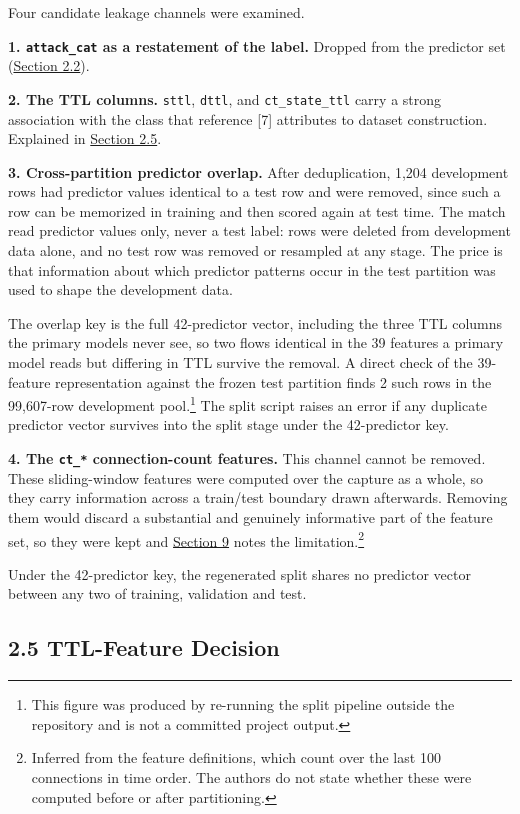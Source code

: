 \documentclass[
  canadian,
  12pt,
]{article}
\let\reportOrigSubsection\subsection
\renewcommand{\subsection}{\par\Needspace*{8\baselineskip}\reportOrigSubsection}%
\begin{document}
Four candidate leakage channels were examined.

\textbf{1. \texttt{attack\_cat} as a restatement of the label.} Dropped
from the predictor set (\hyperref[sec-2-2]{Section 2.2}).

\textbf{2. The TTL columns.} \texttt{sttl}, \texttt{dttl}, and
\texttt{ct\_state\_ttl} carry a strong association with the class that
reference {[}7{]} attributes to dataset construction. Explained in
\hyperref[sec-2-5]{Section 2.5}.

\textbf{3. Cross-partition predictor overlap.} After deduplication,
1,204 development rows had predictor values identical to a test row and
were removed, since such a row can be memorized in training and then
scored again at test time. The match read predictor values only, never a
test label: rows were deleted from development data alone, and no test
row was removed or resampled at any stage. The price is that information
about which predictor patterns occur in the test partition was used to
shape the development data.

The overlap key is the full 42-predictor vector, including the three TTL
columns the primary models never see, so two flows identical in the 39
features a primary model reads but differing in TTL survive the removal.
A direct check of the 39-feature representation against the frozen test
partition finds 2 such rows in the 99,607-row development
pool.\footnote{This figure was produced by re-running the split pipeline
  outside the repository and is not a committed project output.} The
split script raises an error if any duplicate predictor vector survives
into the split stage under the 42-predictor key.

\textbf{4. The \texttt{ct\_*} connection-count features.} This channel
cannot be removed. These sliding-window features were computed over the
capture as a whole, so they carry information across a train/test
boundary drawn afterwards. Removing them would discard a substantial and
genuinely informative part of the feature set, so they were kept and
\hyperref[sec-9]{Section 9} notes the limitation.\footnote{Inferred from
  the feature definitions, which count over the last 100 connections in
  time order. The authors do not state whether these were computed
  before or after partitioning.}

Under the 42-predictor key, the regenerated split shares no predictor
vector between any two of training, validation and test.

\subsection[\texorpdfstring{\numberline{2.5}TTL-Feature Decision}{2.5 TTL-Feature Decision}]{2.5 TTL-Feature Decision}\label{sec-2-5}
\end{document}
